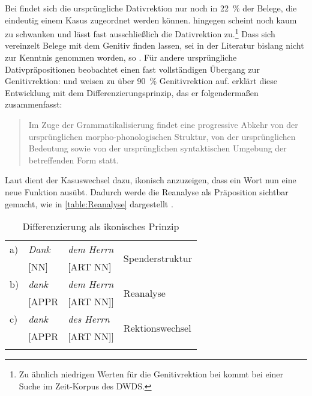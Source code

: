 Bei  findet sich die ursprüngliche Dativrektion nur noch in 22~\% der Belege, die eindeutig einem Kasus zugeordnet werden können. 
 hingegen scheint noch kaum zu schwanken und lässt fast ausschließlich die Dativrektion zu.\footnote{Zu ähnlich niedrigen Werten für die Genitivrektion bei \gegenueber{} kommt \citet[9]{Krause2012b} bei einer Suche im Zeit-Korpus des DWDS.}
Dass sich vereinzelt Belege mit dem Genitiv finden lassen, sei in der Literatur bislang nicht zur Kenntnis genommen worden, so \citet[109]{DiMeola2002}. 
Für andere ursprüngliche Dativpräpositionen beobachtet \citet[209]{DiMeola2000} einen fast vollständigen Übergang zur Genitivrektion:  und  weisen zu über 90~\% Genitivrektion auf. 
\citet[]{DiMeola2000} erklärt diese Entwicklung mit dem Differenzierungsprinzip, das er folgendermaßen zusammenfasst: 
\begin{quote}Im Zuge der Grammatikalisierung findet eine progressive Abkehr von der urspr{\"u}nglichen morpho-phonologischen Struktur, von der urspr{\"u}nglichen Bedeutung sowie von der urspr{\"u}nglichen syntaktischen Umgebung der betreffenden Form statt.~\citep[144]{DiMeola2000}\end{quote} 
Laut \citet[422]{DiMeola2006} dient der Kasuswechsel dazu, ikonisch anzuzeigen, dass ein Wort nun eine neue Funktion ausübt. 
Dadurch werde die Reanalyse als Präposition sichtbar gemacht, wie in \autoref{table:Reanalyse} dargestellt \citep[s.][348]{DiMeola1999}. 
\begin{table}
\centering
\begin{tabular}{llll}
\lsptoprule
a) & \textit{Dank} & \textit{dem Herrn} & \multirow{2}{*}{Spenderstruktur} \\
   & {[}NN{]}      & {[}ART NN{]}       &                                  \\
   \tablevspace
b) & \textit{dank} & \textit{dem Herrn} & \multirow{2}{*}{Reanalyse}       \\
   & {[}APPR       & {[}ART NN{]}{]}    &                                  \\
   \tablevspace
c) & \textit{dank }         & \textit{des Herrn}          & \multirow{2}{*}{Rektionswechsel} \\
   & {[}APPR       & {[}ART NN{]}{]}    &   \\
\lspbottomrule
\end{tabular}
\caption{Differenzierung als ikonisches Prinzip}
\label{table:Reanalyse}
\end{table}

